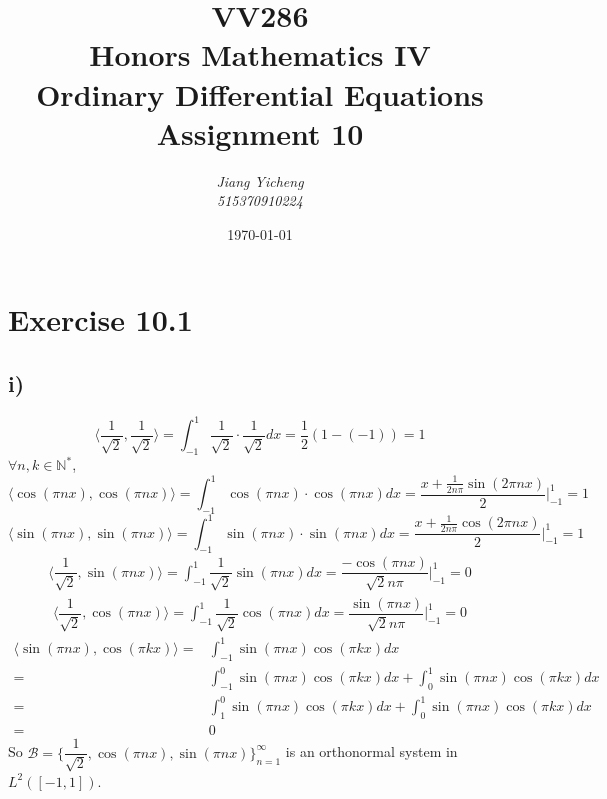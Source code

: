 \documentclass[a4paper,12pt,titlepage]{article}
\author{\textit{Jiang Yicheng}\\\textit{515370910224}}
\title{\textbf{VV286\\ Honors Mathematics IV\\
Ordinary Differential Equations\\
		Assignment 10}}
\date{\today}
\begin{document}
\maketitle

\section*{Exercise 10.1}
\subsection*{i)}
$$\langle \dfrac{1}{\sqrt{2}},\dfrac{1}{\sqrt{2}}\rangle=\int_{-1}^{1}\dfrac{1}{\sqrt{2}}\cdot
 \dfrac{1}{\sqrt{2}}dx=\dfrac{1}{2}(1-(-1))=1$$
$\forall n,k\in\mathbb{N}^*$,
$$\langle \cos(\pi nx),\cos(\pi nx)\rangle=\int_{-1}^{1}\cos(\pi nx)\cdot \cos(\pi nx)dx=\dfrac{x+\frac{1}{2n\pi}\sin(2\pi n x)}{2}|_{-1}^1=1$$
$$\langle \sin(\pi nx),\sin(\pi nx)\rangle=\int_{-1}^{1}\sin(\pi nx)\cdot \sin(\pi nx)dx=\dfrac{x+\frac{1}{2n\pi}\cos(2\pi n x)}{2}|_{-1}^1=1$$
\begin{align*}
\langle \dfrac{1}{\sqrt{2}},\sin(\pi nx)\rangle=\int_{-1}^{1}\dfrac{1}{\sqrt{2}}\sin(\pi nx)dx=\dfrac{-\cos(\pi n x)}{\sqrt{2}n\pi}|_{-1}^1=0
\end{align*}
\begin{align*}
\langle \dfrac{1}{\sqrt{2}},\cos(\pi nx)\rangle=\int_{-1}^{1}\dfrac{1}{\sqrt{2}}\cos(\pi nx)dx=\dfrac{\sin(\pi n x)}{\sqrt{2}n\pi}|_{-1}^1=0
\end{align*}
\begin{align*}
\langle \sin(\pi nx),\cos(\pi kx)\rangle=&\int_{-1}^{1}\sin(\pi nx)\cos(\pi kx)dx\\
=&\int_{-1}^{0}\sin(\pi nx)\cos(\pi kx)dx+\int_{0}^{1}\sin(\pi nx)\cos(\pi kx)dx\\
=&\int_{1}^{0}\sin(\pi nx)\cos(\pi kx)dx+\int_{0}^{1}\sin(\pi nx)\cos(\pi kx)dx\\
=&0
\end{align*}
So $\mathcal{B}=\lbrace \dfrac{1}{\sqrt{2}},\cos(\pi nx),\sin(\pi nx)\rbrace_{n=1}^{\infty}$ is an orthonormal system in $L^2([-1, 1])$.
\end{document}

